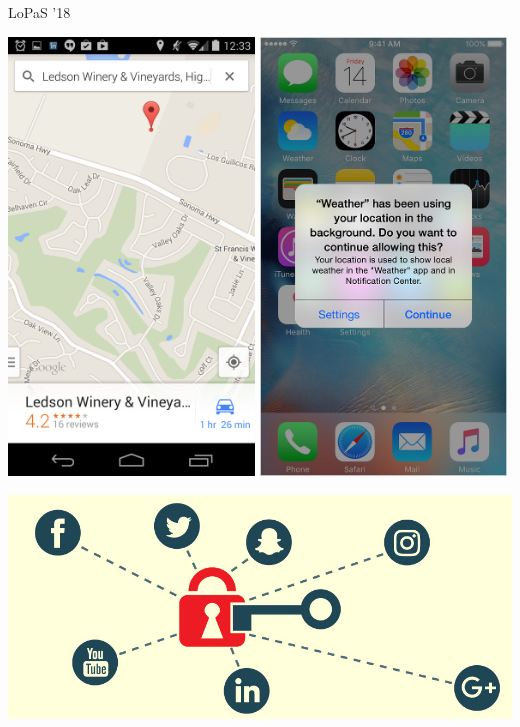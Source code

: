 \documentclass[10pt]{beamer}
\begin{document}
	\begin{frame}{LoPaS '18}
		\begin{minipage}[c]{0.65\textwidth}
			\includegraphics[width=0.49\textwidth]{figures/screen1.jpg}
			\includegraphics[width=0.49\textwidth]{figures/screen2.jpg}
		\end{minipage}
		\hfill
		\begin{minipage}[c]{0.34\textwidth}
			\includegraphics[width=\textwidth]{figures/sm.jpg}
			

\end{minipage}
\end{frame}
\end{document}
